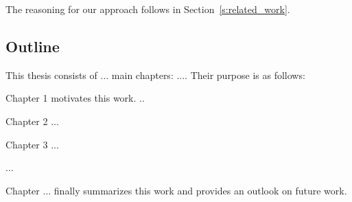  The reasoning for our approach follows in Section~\ref{s:related_work}.



\subsection{Outline}

This thesis consists of ... main chapters: .... Their purpose is as follows:

Chapter 1 motivates this work.
..

Chapter 2 ...

Chapter 3 ...

...

Chapter ... finally summarizes this work and provides an outlook on future work.






